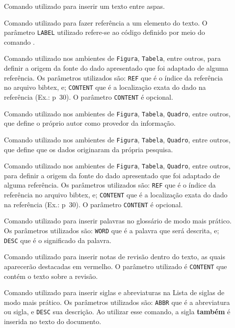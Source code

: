 \begin{description}
    
    \item[] Comando utilizado para inserir um texto entre aspas.
    \item[] Comando utilizado para fazer referência a um elemento do texto. O parâmetro \texttt{LABEL} utilizado refere-se ao código definido por meio do comando .
    \item[] Comando utilizado nos ambientes de \texttt{Figura}, \texttt{Tabela}, entre outros, para definir a origem da fonte do dado apresentado que foi adaptado de alguma referência. Os parâmetros utilizados são: \texttt{REF} que é o índice da referência no arquivo bibtex, e; \texttt{CONTENT} que é a localização exata do dado na referência (Ex.: p~30). O parâmetro \texttt{CONTENT} é opcional.
    \item[] Comando utilizado nos ambientes de \texttt{Figura}, \texttt{Tabela}, \texttt{Quadro}, entre outros, que define o próprio autor como provedor da informação.
    \item[] Comando utilizado nos ambientes de \texttt{Figura}, \texttt{Tabela}, \texttt{Quadro}, entre outros, que define que os dados originaram da própria pesquisa.
    \item[] Comando utilizado nos ambientes de \texttt{Figura}, \texttt{Tabela}, \texttt{Quadro}, entre outros, para definir a origem da fonte do dado apresentado que foi adaptado de alguma referência. Os parâmetros utilizados são: \texttt{REF} que é o índice da referência no arquivo bibtex, e; \texttt{CONTENT} que é a localização exata do dado na referência (Ex.: p~30). O parâmetro \texttt{CONTENT} é opcional.
    \item[] Comando utilizado para inserir palavras no glossário de modo mais prático. Os parâmetros utilizados são: \texttt{WORD} que é a palavra que será descrita, e; \texttt{DESC} que é o significado da palavra.
    \item[] Comando utilizado para inserir notas de revisão dentro do texto, as quais aparecerão destacadas em vermelho. O parâmetro utilizado é \texttt{CONTENT} que contém o texto sobre a revisão.
    \item[] Comando utilizado para inserir siglas e abreviaturas na Lista de siglas de modo mais prático. Os parâmetros utilizados são: \texttt{ABBR} que é a abreviatura ou sigla, e \texttt{DESC} sua descrição. Ao utilizar esse comando, a sigla \textbf{também} é inserida no texto do documento.

\end{description}
